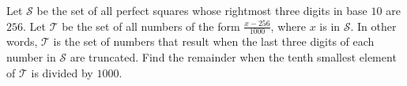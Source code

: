 Let $\mathcal{S}$ be the set of all perfect squares whose rightmost three digits in base $10$ are $256$. Let $\mathcal{T}$ be the set of all numbers of the form $\frac{x-256}{1000}$, where $x$ is in $\mathcal{S}$. In other words, $\mathcal{T}$ is the set of numbers that result when the last three digits of each number in $\mathcal{S}$ are truncated. Find the remainder when the tenth smallest element of $\mathcal{T}$ is divided by $1000$.